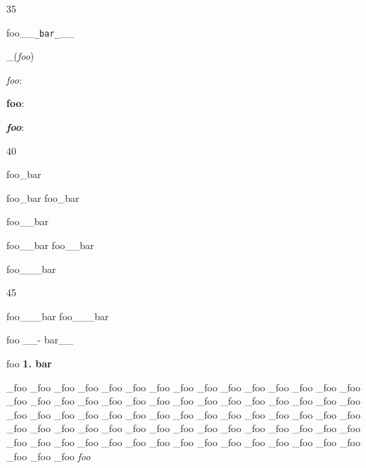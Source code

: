 35

foo\_\_\texttt{\_bar\_}\_\_

\_(\emph{foo})

\emph{foo}:

\textbf{foo}:

\textbf{\emph{foo}}:

40

foo\_bar

foo\_bar foo\_bar

foo\_\_bar

foo\_\_bar foo\_\_bar

foo\_\_\_bar

45

foo\_\_\_bar foo\_\_\_bar

foo \_\_- bar\_\_

foo \textbf{1. bar}

\_foo
\_foo
\_foo
\_foo
\_foo
\_foo
\_foo
\_foo
\_foo
\_foo
\_foo
\_foo
\_foo
\_foo
\_foo
\_foo
\_foo
\_foo
\_foo
\_foo
\_foo
\_foo
\_foo
\_foo
\_foo
\_foo
\_foo
\_foo
\_foo
\_foo
\_foo
\_foo
\_foo
\_foo
\_foo
\_foo
\_foo
\_foo
\_foo
\_foo
\_foo
\_foo
\_foo
\_foo
\_foo
\_foo
\_foo
\_foo
\_foo
\_foo
\_foo
\_foo
\_foo
\_foo
\_foo
\_foo
\_foo
\_foo
\_foo
\_foo
\_foo
\_foo
\_foo
\_foo
\_foo
\_foo
\_foo
\_foo
\_foo
\_foo
\_foo
\_foo
\_foo
\_foo
\_foo
\_foo
\_foo
\_foo
\emph{foo}



